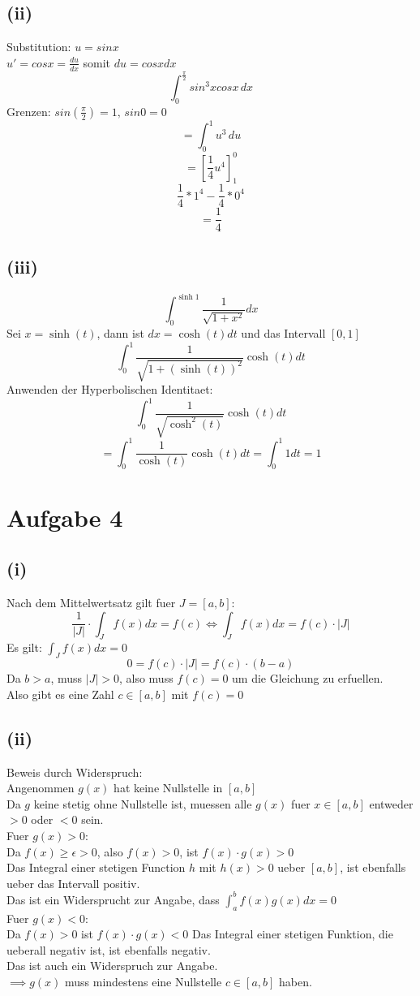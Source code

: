 \documentclass{article}
\begin{document}
\subsection*{(ii)}
Substitution: $u=sinx$\\
$u'=cosx=\frac{du}{dx}$ somit $du=cosxdx$
\[\int_0^{\frac{\pi}{2}}sin^3xcosx\,dx\]
Grenzen: $sin(\frac{\pi}{2})=1,\,sin0=0$
\[=\int_0^1u^3\,du\]
\[=[\frac{1}{4}u^4]_1^0\]
\[\frac{1}{4}*1^4-\frac{1}{4}*0^4\]
\[=\frac{1}{4}\]

\subsection*{(iii)}
\[\int_0^{\sinh 1} \frac{1}{\sqrt{1+x^2}} dx\]
Sei $x = \sinh(t)$, dann ist $dx = \cosh(t)dt$ und das Intervall $[0, 1]$\\
\[\int_0^{1} \frac{1}{\sqrt{1+(\sinh(t))^2}} \cosh(t)dt\]
Anwenden der Hyperbolischen Identitaet:
\[\int_0^1 \frac{1}{\sqrt{\cosh^2(t)}} \cosh(t)dt \]
\[= \int_0^1 \frac{1}{\cosh(t)} \cosh(t)dt = \int_0^1 1 dt = 1\]

\section*{Aufgabe 4}
\subsection*{(i)}
Nach dem Mittelwertsatz gilt fuer $J = [a,b]$:
\[\frac{1}{|J|} \cdot \int_{J} f(x)dx =  f(c) \Longleftrightarrow \int_J f(x) dx = f(c) \cdot |J| \]
Es gilt: $\int_J f(x) dx = 0$
\[0 = f(c) \cdot |J| = f(c) \cdot (b - a)\]
Da $b > a$, muss $|J| > 0$, also muss $f(c) = 0$ um die Gleichung zu erfuellen.  \\
Also gibt es eine Zahl $c \in [a, b]$ mit $f(c) = 0$

\subsection*{(ii)}
Beweis durch Widerspruch: \\ 
Angenommen $g(x)$ hat keine Nullstelle in $[a,b]$ \\
Da $g$ keine stetig ohne Nullstelle ist, muessen alle $g(x)$ fuer $x \in [a,b]$ entweder $> 0$ oder $< 0$ sein. \\
\newline
Fuer $g(x) > 0$: \\
Da $f(x) \geq \epsilon > 0$, also $f(x) > 0$, ist $f(x) \cdot g(x) > 0$ \\
Das Integral einer stetigen Function $h$ mit $h(x) > 0$ ueber $[a,b]$, ist ebenfalls ueber das Intervall positiv. \\
Das ist ein Widersprucht zur Angabe, dass $\int_{a}^{b}f(x)g(x)dx = 0$ \\
\newline
Fuer $g(x) < 0$: \\
Da $f(x) > 0$ ist $f(x) \cdot g(x) < 0$
Das Integral einer stetigen Funktion, die ueberall negativ ist, ist ebenfalls negativ. \\
Das ist auch ein Widerspruch zur Angabe. \\
\newline
$\implies g(x)$ muss mindestens eine Nullstelle $c \in [a,b]$ haben. 
\end{document}
